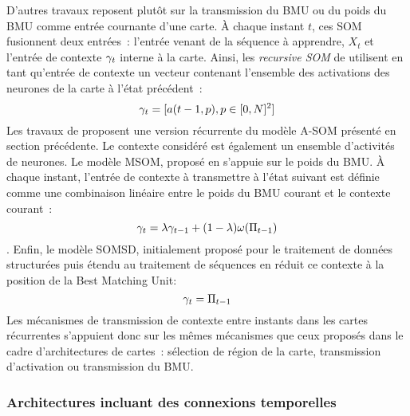\documentclass[../main]{subfiles}
\begin{document}
D'autres travaux reposent plutôt sur la transmission du BMU ou du poids du BMU comme entrée cournante d'une carte.
\`A chaque instant $t$, ces SOM fusionnent deux entrées~: l'entrée venant de la séquence à apprendre, $X_t$ et l'entrée de contexte $\gamma_t$ interne à la carte.
Ainsi, les \emph{recursive SOM} de \cite{Voegtlin2002RecursiveSM} utilisent en tant qu'entrée de contexte un vecteur contenant l'ensemble des activations des neurones de la carte à l'état précédent~: $$\gamma_t = [a(t-1,p), p \in [0,N]^2]$$
Les travaux de \cite{Buonamente2013SimulatingAW} proposent une version récurrente du modèle A-SOM présenté en section précédente. Le contexte considéré est également un ensemble d'activités de neurones. 
Le modèle MSOM, proposé en \cite{Strickert2005MergeSF} s'appuie sur le poids du BMU. 
\`A chaque instant, l'entrée de contexte à transmettre à l'état suivant est définie comme une combinaison linéaire entre le poids du BMU courant et le contexte courant~:
$$\gamma_t = \lambda \gamma_{t-1} + (1-\lambda)\omega(\Pi_{t-1}) $$.
Enfin, le modèle SOMSD, initialement proposé pour le traitement de données structurées \parencite{hagenbuchner_self-organizing_2003} puis étendu au traitement de séquences en \cite{hammer_recursive_2004,hammer_self-organizing_2005} réduit ce contexte à la position de la Best Matching Unit:
$$ \gamma_{t} = \Pi_{t-1}$$
Les mécanismes de transmission de contexte entre instants dans les cartes récurrentes s'appuient donc sur les mêmes mécanismes que ceux proposés dans le cadre d'architectures de cartes~: sélection de région de la carte, transmission d'activation ou transmission du BMU.

\subsubsection{Architectures incluant des connexions temporelles}
\end{document}
